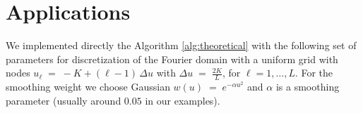 \documentclass[reqno, 11pt]{amsart}%
\newcommand\cL{\mathcal L}
\newcommand\EE{\mathbb E}
\theoremstyle{definition}
\begin{document}

\section{Applications}\label{sec:appl}
We implemented directly the Algorithm \ref{alg:theoretical} with the following set of parameters for discretization of the Fourier domain with a uniform grid with nodes $ u_\ell \;=\; -K + (\ell-1)\,\Delta u$ with $
\Delta u \;=\; \frac{2K}{L}$, for $ \ell=1,\dots,L$. For the smoothing weight we choose Gaussian $w(u)\;=\;e^{-\alpha u^{2}}$ and $\alpha$ is a smoothing parameter (usually around $0.05$ in our examples). 
\end{document}

